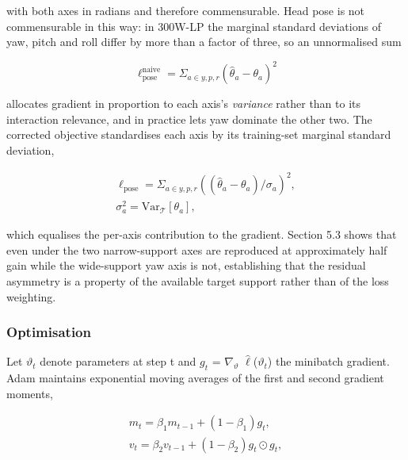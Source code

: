 with both axes in radians and therefore commensurable. Head pose is not commensurable in this way: in 300W-LP the marginal standard deviations of yaw, pitch and roll differ by more than a factor of three, so an unnormalised sum

\begin{equation}
\label{eq:91}
\ell _{\mathrm{pose}}^{\mathrm{naive}} = \Sigma _{a \in {y,p,r}} ( \hat{\theta }_a - \theta _a )^{2}
\end{equation}

allocates gradient in proportion to each axis's \emph{variance} rather than to its interaction relevance, and in practice lets yaw dominate the other two. The corrected objective standardises each axis by its training-set marginal standard deviation,

\begin{equation}
\label{eq:92}
\begin{aligned}
\ell _{\mathrm{pose}} = \Sigma _{a \in {y,p,r}} ( ( \hat{\theta }_a - \theta _a ) / \sigma _a )^{2} , \\
\sigma _a^{2} = \mathrm{Var}_{\mathcal{T}}[ \theta _a ],
\end{aligned}
\end{equation}

which equalises the per-axis contribution to the gradient. Section 5.3 shows that even under  the two narrow-support axes are reproduced at approximately half gain while the wide-support yaw axis is not, establishing that the residual asymmetry is a property of the available target support rather than of the loss weighting.

\subsubsection{Optimisation}

Let $\vartheta_{t}$ denote parameters at step t and $g_{t}$ = $\nabla_{\vartheta}$ $\hat{\ell }$($\vartheta_{t}$) the minibatch gradient. Adam  maintains exponential moving averages of the first and second gradient moments,

\begin{equation}
\label{eq:93}
\begin{aligned}
m_t = \beta _{1} m_{t-1} + (1 - \beta _{1}) g_t, \\
v_t = \beta _{2} v_{t-1} + (1 - \beta _{2}) g_t \odot g_t ,
\end{aligned}
\end{equation}

